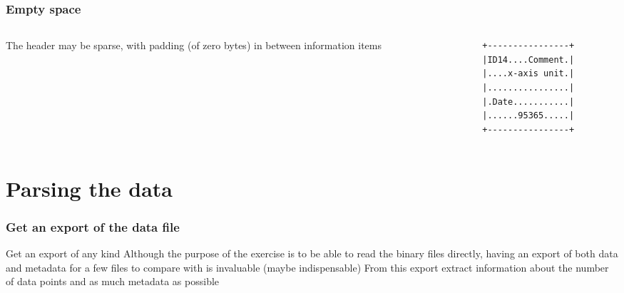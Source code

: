 \documentclass{beamer}
\begin{document}
\begin{frame}[fragile]
  \frametitle{Empty space}
  \begin{columns}[onlytextwidth]
    \begin{column}{0.4\textwidth}
      The header may be sparse, with padding (of zero bytes) in between information items
    \end{column}
    \begin{column}{0.6\textwidth}
      \begin{verbatim}
        +----------------+
        |ID14....Comment.|
        |....x-axis unit.|
        |................|
        |.Date...........|
        |......95365.....|
        +----------------+
      \end{verbatim}
    \end{column}
  \end{columns}
\end{frame}

\section{Parsing the data}

\begin{frame}
  \frametitle{Get an export of the data file}
  \begin{alertblock}{Get an export of any kind}
    Although the purpose of the exercise is to be able to read the
    binary files directly, having an export of both data and metadata
    for a few files to compare with is invaluable (maybe
    indispensable)\newline
    \newline
    From this export extract information about the number of data points
    and as much metadata as possible
  \end{alertblock}
\end{frame}
\end{document}
